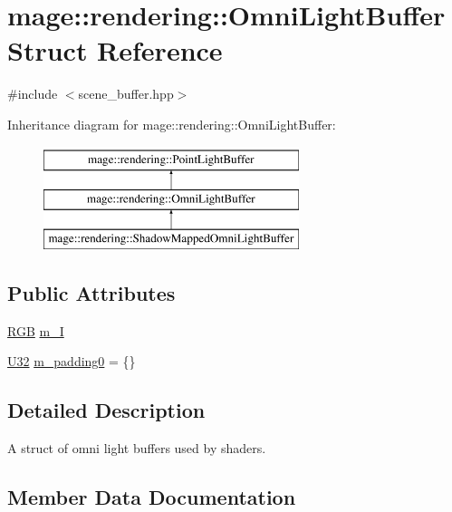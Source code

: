 \hypertarget{structmage_1_1rendering_1_1_omni_light_buffer}{}\section{mage\+:\+:rendering\+:\+:Omni\+Light\+Buffer Struct Reference}
\label{structmage_1_1rendering_1_1_omni_light_buffer}


{\ttfamily \#include $<$scene\+\_\+buffer.\+hpp$>$}

Inheritance diagram for mage\+:\+:rendering\+:\+:Omni\+Light\+Buffer\+:\begin{figure}[H]
\begin{center}
\leavevmode
\includegraphics[height=3.000000cm]{structmage_1_1rendering_1_1_omni_light_buffer}
\end{center}
\end{figure}
\subsection*{Public Attributes}
\begin{DoxyCompactItemize}
\item 
\mbox{\hyperlink{structmage_1_1_r_g_b}{R\+GB}} \mbox{\hyperlink{structmage_1_1rendering_1_1_omni_light_buffer_a01b8cc152dd0ea2b961448ad3057a5d0}{m\+\_\+I}}
\item 
\mbox{\hyperlink{namespacemage_aa5d6eaabaac3cdd01873d6a3d27e90f3}{U32}} \mbox{\hyperlink{structmage_1_1rendering_1_1_omni_light_buffer_a3b440492e1a9fc48c6f109e5787aa4c7}{m\+\_\+padding0}} = \{\}
\end{DoxyCompactItemize}


\subsection{Detailed Description}
A struct of omni light buffers used by shaders. 

\subsection{Member Data Documentation}
\mbox{\label{structmage_1_1rendering_1_1_omni_light_buffer_a01b8cc152dd0ea2b961448ad3057a5d0}} 
